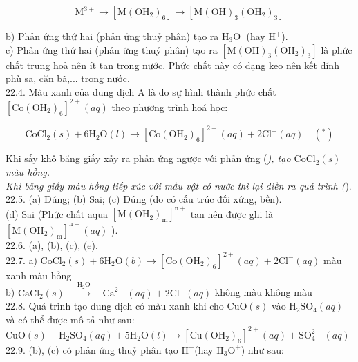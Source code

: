 \documentclass[10pt]{article}
\begin{document}
$$
\mathrm{M}^{3+} \rightarrow\left[\mathrm{M}\left(\mathrm{OH}_{2}\right)_{6}\right] \rightarrow\left[\mathrm{M}(\mathrm{OH})_{3}\left(\mathrm{OH}_{2}\right)_{3}\right]
$$

b) Phản ứng thứ hai (phản ứng thuỷ phân) tạo ra $\mathrm{H}_{3} \mathrm{O}^{+}$(hay $\mathrm{H}^{+}$).\\
c) Phản ứng thứ hai (phản ứng thuỷ phân) tạo ra $\left[\mathrm{M}(\mathrm{OH})_{3}\left(\mathrm{OH}_{2}\right)_{3}\right]$ là phức chất trung hoà nên ít tan trong nước. Phức chất này có dạng keo nên kết dính phù sa, cặn bã,... trong nước.\\
22.4. Màu xanh của dung dịch A là do sự hình thành phức chất $\left[\mathrm{Co}\left(\mathrm{OH}_{2}\right)_{6}\right]^{2+}(a q)$ theo phương trình hoá học:

$$
\mathrm{CoCl}_{2}(s)+6 \mathrm{H}_{2} \mathrm{O}(l) \rightarrow\left[\mathrm{Co}\left(\mathrm{OH}_{2}\right)_{6}\right]^{2+}(a q)+2 \mathrm{Cl}^{-}(a q) \quad\left(^{*}\right)
$$

Khi sấy khô băng giấy xảy ra phản ứng ngược với phản ứng (\textit{), tạo $\mathrm{CoCl}_{2}(s)$ màu hồng.\\
Khi băng giấy màu hồng tiếp xúc với mẫu vật có nước thì lại diễn ra quá trình (}).\\
22.5. (a) Đúng; (b) Sai; (c) Đúng (do có cấu trúc đối xứng, bền).\\
(d) Sai (Phức chất aqua $\left[\mathrm{M}\left(\mathrm{OH}_{2}\right)_{\mathrm{m}}\right]^{\mathrm{n}+}$ tan nên được ghi là $\left[\mathrm{M}\left(\mathrm{OH}_{2}\right)_{\mathrm{m}}\right]^{\mathrm{n}+}(a q)$ ).\\
22.6. (a), (b), (c), (e).\\
22.7. a) $\mathrm{CoCl}_{2}(s)+6 \mathrm{H}_{2} \mathrm{O}(b) \rightarrow\left[\mathrm{Co}\left(\mathrm{OH}_{2}\right)_{6}\right]^{2+}(a q)+2 \mathrm{Cl}^{-}(a q)$ màu xanh màu hồng\\
b) $\mathrm{CaCl}_{2}(s) \quad \xrightarrow{\mathrm{H}_{2} \mathrm{O}} \quad \mathrm{Ca}^{2+}(a q)+2 \mathrm{Cl}^{-}(a q)$ không màu không màu\\
22.8. Quá trình tạo dung dịch có màu xanh khi cho $\mathrm{CuO}(s)$ vào $\mathrm{H}_{2} \mathrm{SO}_{4}(a q)$ và có thể được mô tả như sau:\\
$\mathrm{CuO}(s)+\mathrm{H}_{2} \mathrm{SO}_{4}(a q)+5 \mathrm{H}_{2} \mathrm{O}(l) \rightarrow\left[\mathrm{Cu}\left(\mathrm{OH}_{2}\right)_{6}\right]^{2+}(a q)+\mathrm{SO}_{4}^{2-}(a q)$\\
22.9. (b), (c) có phản ứng thuỷ phân tạo $\mathrm{H}^{+}$(hay $\mathrm{H}_{3} \mathrm{O}^{+}$) như sau:
\end{document}

